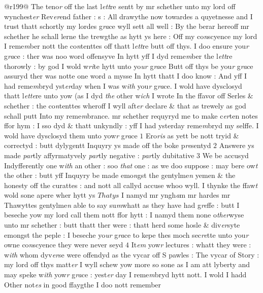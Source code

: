 \documentclass[12pt, a4paper]{book}
\begin{document}
      				
      				@r199@ The teno\textit{r} off the last l\textit{ett}re sentt by mr schether unto my lord off wynchest\textit{er} Rev\textit{er}end father : s : All drawythe now towardes a quyetnesse and I trust thatt schortly my lordes g\textit{ra}ce wyll sett all well : By the berar hereoff mr schether he schall lerne the trewgthe as hytt ys here : Off my co\textit{n}scyence my lord I reme\textit{m}ber nott the co\textit{n}tenttes off thatt l\textit{ett}re butt off thys. I doo ensure you\textit{r} g\textit{ra}ce : ther was noo word offensyve In hytt yff I dyd reme\textit{m}ber the l\textit{ett}re thorowly : by god I wold w\textit{ri}te hytt unto yo\textit{ur} g\textit{ra}ce Butt off thys be you\textit{r} g\textit{ra}ce assuryd ther was notte one word a mysse In hytt thatt I doo know : And yff I had reme\textit{m}bryd yst\textit{er}day when I was w\textit{ith} you\textit{r} g\textit{ra}ce. I wold have dysclosyd thatt l\textit{ette}re unto yow (as I dyd \textit{the} other w\textit{ich} I wrote In the ffavor off Serles \& schether : the co\textit{n}tenttes wheroff I wyll aft\textit{er} declare \& that as trewely as god schall putt Into my reme\textit{m}brance. mr schether requyryd me to make c\textit{er}ten notes ffor hym : I sso dyd \& thatt unkyndly : yff I had ysterday reme\textit{m}bryd my selffe. I wold  have dysclosyd them unto yow\textit{r} g\textit{ra}ce $1$ Ero\textit{ris} as yett be nott tryid \& correctyd : butt dylygentt Inquyry ys made off the boke p\textit{re}sentyd $2$ Answere ys made \textit{par}tly affyrmatyvely \textit{par}tly negative : \textit{par}tly dubitative $3$ We be accusyd Indyfferently one w\textit{ith} an other : soo \textit{that} one : as we doo suppose : may bere ow\textit{t} the other : butt yff Inquyry be made emo\textit{n}gst the  gentylme\textit{n} yemen \& the honesty off the curattes : and nott all callyd accuse whoo wyll. I thynke the ffaw\textit{t} wold sone apere wher hytt ys $Thatys$ I namyd mr yngh\textit{a}m mr hardes mr Thawyttes gentylme\textit{n} able to say su\textit{m}whatt as they have had g\textit{re}ffe : butt I beseche yow my lord call them nott ffor hytt : I namyd them none o\textit{ther}wyse unto mr schether : butt thatt ther  were : thatt herd some hosle \& div\textit{er}syte emongst the peple : I beseche yo\textit{ur}  g\textit{ra}ce to kepe thes moch sec\textit{re}tte unto you\textit{r} owne co\textit{n}scyence they were never seyd $4$ It\textit{em} yow\textit{r} lectures : whatt they were : w\textit{ith }whom dyv\textit{er}se were offendyd as the vycar off S pawles : The vycar of Story : my lord off thys matt\textit{er} I wyll schew yow more so sone as I am att lyberty and may speke w\textit{ith} yow\textit{r} g\textit{ra}ce : yest\textit{er} day I reme\textit{m}bryd hytt nott. I wold I hadd Other not\textit{es} in good ffaygthe I doo nott remember 
      				
\end{document}
